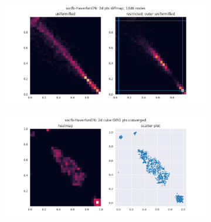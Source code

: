 \begin{figure}
  \begin{subfigure}{\textwidth}
    \centering
    \includegraphics[width=\linewidth]{figures/socfb-Haverford76_2ddiffmap_unif_vs_restrict.png}
  \end{subfigure}

  \vspace{1em}
  \begin{subfigure}{\textwidth}
    \centering
    \includegraphics[width=\linewidth]{figures/socfb-Haverford76_2d_cube_GIRG_converged.png}
  \end{subfigure}

\end{figure}



